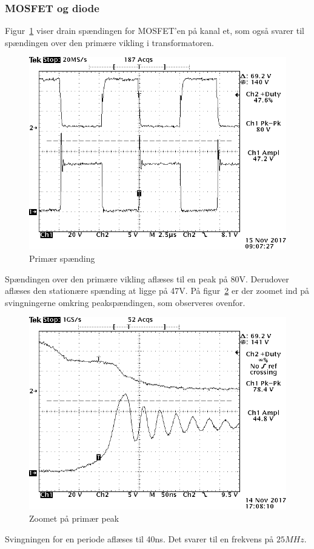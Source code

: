\subsubsection{MOSFET og diode}
\noindent Figur~\ref{fig: privolt} viser drain spændingen for MOSFET'en på kanal et, som også svarer til spændingen over den primære vikling i transformatoren.
\begin{figure}[H]
	\center
	\includegraphics[max width=0.7\linewidth]{../dokumentation/tex/2iteration/billeder/Realisering/Transformator_Primar.png}
	\caption{Primær spænding}
	\label{fig: privolt}
\end{figure}
\noindent Spændingen over den primære vikling aflæses til en peak på 80V. Derudover aflæses den stationære spænding at ligge på 47V. 
På figur~\ref{fig: prizoom} er der zoomet ind på svingningerne omkring peakspændingen, som observeres ovenfor.
\begin{figure}[H]
	\center
	\includegraphics[max width=0.7\linewidth]{../dokumentation/tex/2iteration/billeder/Realisering/Transformator_Primarzoom.png}
	\caption{Zoomet på primær peak}
	\label{fig: prizoom}
\end{figure}
\noindent Svingningen for en periode aflæses til 40ns. Det svarer til en frekvens på $25MHz$.

